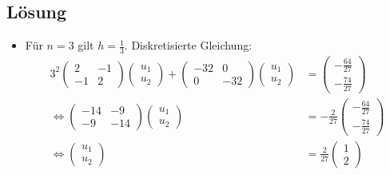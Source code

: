\documentclass{exercise}
\begin{document}
    \subsection*{Lösung}
    \begin{itemize}
        \item Für \(n = 3\) gilt \(h = \frac{1}{3}\).
        Diskretisierte Gleichung:
        \begin{align*}
            3^2\begin{pmatrix}
                2 & -1\\
                -1 & 2
            \end{pmatrix}\begin{pmatrix}
                u_1\\u_2
            \end{pmatrix} + \begin{pmatrix}
                -32 & 0\\
                0 & -32
            \end{pmatrix}\begin{pmatrix}
                u_1\\u_2
            \end{pmatrix} &= \begin{pmatrix}
                -\frac{64}{27}\\-\frac{74}{27}
            \end{pmatrix}\\
            \iff \begin{pmatrix}
                -14 & -9\\
                -9 & -14
            \end{pmatrix}\begin{pmatrix}
                u_1\\u_2
            \end{pmatrix} &= -\frac{2}{27}\begin{pmatrix}
                -\frac{64}{27}\\-\frac{74}{27}
            \end{pmatrix}\\
            \iff \begin{pmatrix}
                u_1\\u_2
            \end{pmatrix} &= \frac{2}{27}\begin{pmatrix}
                1\\2
            \end{pmatrix}
        \end{align*}

\end{itemize}
\end{document}
